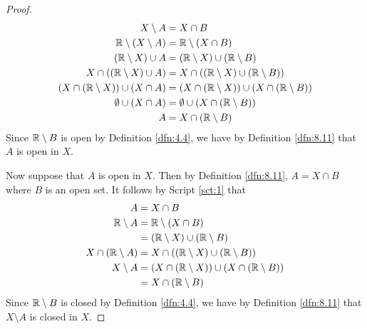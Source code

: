 \documentclass[../main.tex]{subfiles}
\begin{document}
\begin{exercise}
\begin{proof}
\begin{align*}
            X\setminus A &= X\cap B\\
            \mathbb{R}\setminus(X\setminus A) &= \mathbb{R}\setminus(X\cap B)\\
            (\mathbb{R}\setminus X)\cup A &= (\mathbb{R}\setminus X)\cup(\mathbb{R}\setminus B)\\
            X\cap((\mathbb{R}\setminus X)\cup A) &= X\cap((\mathbb{R}\setminus X)\cup(\mathbb{R}\setminus B))\\
            (X\cap(\mathbb{R}\setminus X))\cup(X\cap A) &= (X\cap(\mathbb{R}\setminus X))\cup(X\cap(\mathbb{R}\setminus B))\\
            \emptyset\cup(X\cap A) &= \emptyset\cup(X\cap(\mathbb{R}\setminus B))\\
            A &= X\cap(\mathbb{R}\setminus B)
        \end{align*}
        Since $\mathbb{R}\setminus B$ is open by Definition \ref{dfn:4.4}, we have by Definition \ref{dfn:8.11} that $A$ is open in $X$.\par
        Now suppose that $A$ is open in $X$. Then by Definition \ref{dfn:8.11}, $A=X\cap B$ where $B$ is an open set. It follows by Script \ref{sct:1} that
        \begin{align*}
            A &= X\cap B\\
            \mathbb{R}\setminus A &= \mathbb{R}\setminus(X\cap B)\\
            &= (\mathbb{R}\setminus X)\cup(\mathbb{R}\setminus B)\\
            X\cap(\mathbb{R}\setminus A) &= X\cap((\mathbb{R}\setminus X)\cup(\mathbb{R}\setminus B))\\
            X\setminus A &= (X\cap(\mathbb{R}\setminus X))\cup(X\cap(\mathbb{R}\setminus B))\\
            &= X\cap(\mathbb{R}\setminus B)
        \end{align*}
        Since $\mathbb{R}\setminus B$ is closed by Definition \ref{dfn:4.4}, we have by Definition \ref{dfn:8.11} that $X\setminus A$ is closed in $X$.
    \end{proof}
\end{exercise}
\end{document}
